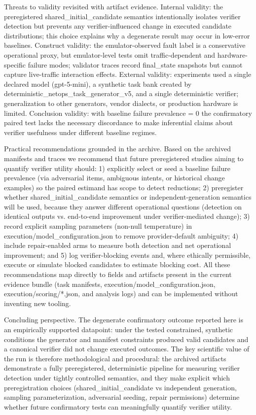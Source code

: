 \documentclass[conference]{IEEEtran}
\begin{document}
Threats to validity revisited with artifact evidence. Internal validity: the preregistered shared\_initial\_candidate semantics intentionally isolates verifier detection but prevents any verifier-influenced change in executed candidate distributions; this choice explains why a degenerate result may occur in low-error baselines. Construct validity: the emulator-observed fault label is a conservative operational proxy, but emulator-level tests omit traffic-dependent and hardware-specific failure modes; validator traces record final\_state snapshots but cannot capture live-traffic interaction effects. External validity: experiments used a single declared model (gpt-5-mini), a synthetic task bank created by deterministic\_netops\_task\_generator\_v5, and a single deterministic verifier; generalization to other generators, vendor dialects, or production hardware is limited. Conclusion validity: with baseline failure prevalence = 0 the confirmatory paired test lacks the necessary discordance to make inferential claims about verifier usefulness under different baseline regimes.

Practical recommendations grounded in the archive. Based on the archived manifests and traces we recommend that future preregistered studies aiming to quantify verifier utility should:
1) explicitly select or seed a baseline failure prevalence (via adversarial items, ambiguous intents, or historical change examples) so the paired estimand has scope to detect reductions; 2) preregister whether shared\_initial\_candidate semantics or independent-generation semantics will be used, because they answer different operational questions (detection on identical outputs vs. end-to-end improvement under verifier-mediated change); 3) record explicit sampling parameters (non-null temperature) in execution/model\_configuration.json to remove provider-default ambiguity; 4) include repair-enabled arms to measure both detection and net operational improvement; and 5) log verifier-blocking events and, where ethically permissible, execute or simulate blocked candidates to estimate blocking cost. All these recommendations map directly to fields and artifacts present in the current evidence bundle (task manifests, execution/model\_configuration.json, execution/scoring/*.json, and analysis logs) and can be implemented without inventing new tooling.

Concluding perspective. The degenerate confirmatory outcome reported here is an empirically supported datapoint: under the tested constrained, synthetic conditions the generator and manifest constraints produced valid candidates and a canonical verifier did not change executed outcomes. The key scientific value of the run is therefore methodological and procedural: the archived artifacts demonstrate a fully preregistered, deterministic pipeline for measuring verifier detection under tightly controlled semantics, and they make explicit which preregistration choices (shared\_initial\_candidate vs independent generation, sampling parameterization, adversarial seeding, repair permissions) determine whether future confirmatory tests can meaningfully quantify verifier utility.
\end{document}

